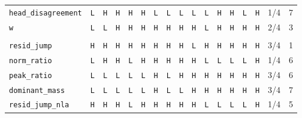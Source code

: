 \begin{table}[t]
\begin{tabular}{@{}lccccccccccccccrr@{}}
\texttt{head\_disagreement} & \texttt{L} & \texttt{H} & \texttt{H} & \texttt{H} & \texttt{H} & \texttt{L} & \texttt{L} & \texttt{L} & \texttt{L} & \texttt{L} & \texttt{H} & \texttt{H} & \texttt{L} & \texttt{H} & 1/4 & 7 \\
\texttt{w} & \texttt{L} & \texttt{L} & \texttt{H} & \texttt{H} & \texttt{H} & \texttt{H} & \texttt{H} & \texttt{H} & \texttt{H} & \texttt{L} & \texttt{H} & \texttt{H} & \texttt{H} & \texttt{H} & 2/4 & 3 \\
\addlinespace
\multicolumn{17}{l}{\emph{activation}} \\
\texttt{resid\_jump} & \texttt{H} & \texttt{H} & \texttt{H} & \texttt{H} & \texttt{H} & \texttt{H} & \texttt{H} & \texttt{H} & \texttt{L} & \texttt{H} & \texttt{H} & \texttt{H} & \texttt{H} & \texttt{H} & 3/4 & 1 \\
\texttt{norm\_ratio} & \texttt{L} & \texttt{H} & \texttt{H} & \texttt{L} & \texttt{H} & \texttt{H} & \texttt{H} & \texttt{H} & \texttt{H} & \texttt{L} & \texttt{L} & \texttt{L} & \texttt{L} & \texttt{H} & 1/4 & 6 \\
\texttt{peak\_ratio} & \texttt{L} & \texttt{L} & \texttt{L} & \texttt{L} & \texttt{L} & \texttt{H} & \texttt{L} & \texttt{H} & \texttt{H} & \texttt{H} & \texttt{H} & \texttt{H} & \texttt{H} & \texttt{H} & 3/4 & 6 \\
\texttt{dominant\_mass} & \texttt{L} & \texttt{L} & \texttt{L} & \texttt{L} & \texttt{L} & \texttt{H} & \texttt{L} & \texttt{L} & \texttt{H} & \texttt{H} & \texttt{H} & \texttt{H} & \texttt{H} & \texttt{H} & 3/4 & 7 \\
\texttt{resid\_jump\_nla} & \texttt{H} & \texttt{H} & \texttt{H} & \texttt{L} & \texttt{H} & \texttt{H} & \texttt{H} & \texttt{H} & \texttt{H} & \texttt{L} & \texttt{L} & \texttt{L} & \texttt{L} & \texttt{H} & 1/4 & 5 \\
\bottomrule
\end{tabular}
\end{table}
